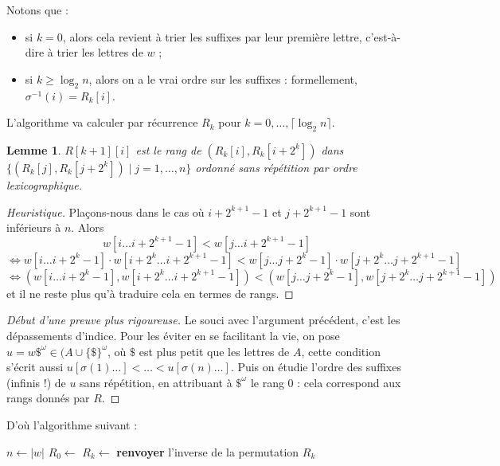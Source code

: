 \documentclass[a4paper, 11pt]{article}
\newtheorem*{lemma}{Lemme}
\begin{document}
Notons que :
\begin{itemize}
\item si $k = 0$, alors cela revient à trier les suffixes par leur première
  lettre, c'est-à-dire à trier les lettres de $w$ ;
\item si $k \geq \log_2 n$, alors on a le vrai ordre sur les suffixes :
  formellement, $\sigma^{-1}(i) = R_k[i]$.
\end{itemize}
L'algorithme va calculer par récurrence $R_k$ pour $k = 0, \ldots, \lceil
\log_2 n \rceil$.

\begin{lemma}
  $R[k+1][i]$ est le rang de $(R_k[i], R_k[i+2^k])$ dans $\{ (R_k[j],
  R_k[j+2^k]) \mid j = 1, \ldots, n \}$ ordonné sans répétition par ordre
  lexicographique.
\end{lemma}

\begin{proof}[Heuristique]
  Plaçons-nous dans le cas où $i + 2^{k+1} - 1$ et $j + 2^{k+1} - 1$ sont
  inférieurs à $n$. Alors
  \[ w[i \ldots i + 2^{k+1} - 1] < w[j \ldots i + 2^{k+1} - 1] \]
\[    \Leftrightarrow
    w[i \ldots i + 2^{k} - 1] \cdot w[i + 2^k \ldots i + 2^{k+1} - 1] <
    w[j \ldots j + 2^{k} - 1] \cdot w[j + 2^k \ldots j + 2^{k+1} - 1]
  \]
\[  \Leftrightarrow
    (w[i \ldots i + 2^{k} - 1], w[i + 2^k \ldots i + 2^{k+1} - 1]) <
    (w[j \ldots j + 2^{k} - 1], w[j + 2^k \ldots j + 2^{k+1} - 1])
  \]
  et il ne reste plus qu'à traduire cela en termes de rangs.
\end{proof}

\begin{proof}[Début d'une preuve plus rigoureuse]
  Le souci avec l'argument précédent, c'est les dépassements d'indice. Pour les
  éviter en se facilitant la vie, on pose $u = w\$^\omega \in (A \cup
  \{\$\}^\omega$, où $ \$ $ est plus petit que les lettres de $A$, cette
  condition s'écrit aussi $u[\sigma(1)\ldots] < \ldots < u[\sigma(n)\ldots]$.
  Puis on étudie l'ordre des suffixes (infinis !) de $u$ sans répétition, en
  attribuant à $\$^\omega$ le rang 0 : cela correspond aux rangs donnés par $R$.
\end{proof}

\newpage

D'où l'algorithme suivant :
\begin{algorithm}
\begin{algorithmic}
  \State $n \gets |w|$
  \State $R_0 \gets $ 
  \State $R_k \gets $ 
  \EndFor
  \State \textbf{renvoyer} l'inverse de la permutation $R_k$
  \EndProcedure
\end{algorithmic}
\end{algorithm}
\end{document}
